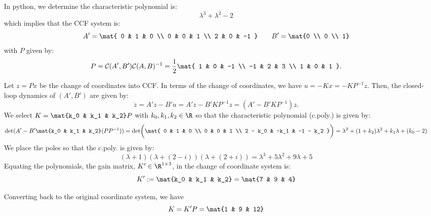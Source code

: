 \documentclass{homework}
\newcommand{\control}{\mathcal{C}}
\begin{document}
\begin{letterenum}
In python, we determine the characteristic polynomial is:
\begin{equation*}
    \lambda^3 + \lambda^2 - 2
\end{equation*}
which implies that the CCF system is:
\begin{equation*}
    A' = \mat{
        0 & 1 & 0 \\
        0 & 0 & 1 \\
        2 & 0 & -1
    } \qquad B' = \mat{0 \\ 0 \\ 1}
\end{equation*}
with $P$ given by:
\begin{equation*}
    P = \control(A', B') \control(A, B)^{-1} = \frac{1}{2}\mat{
        1 & 0 & -1 \\
        -1 & 2 & 3 \\
        1 & 0 & 1
    }.
\end{equation*}
\item 
Let $z = Px$ be the change of coordinates into CCF. In terms of the change of coordinates,
we have $u = -Kx = -KP^{-1}z$. Then, the closed-loop
dynamics of $(A', B')$ are given by:
\begin{equation*}
    \dot{z} = A'z - B'u = A'z - B'KP^{-1}z = (A' - B'KP^{-1})z.
\end{equation*}
We select $K = \mat{k_0 & k_1 & k_2}P$ with $k_0,k_1,k_2\in\R$ so that the characteristic polynomial (c.poly.)
is given by:
\begin{equation*}
    \det(A' - B'\mat{k_0 & k_1 & k_2} (PP^{-1})) = \det\biggl(\mat{
        0 & 1 & 0 \\
        0 & 0 & 1 \\
        2 - k_0 & -k_1 & -1 - k_2
    }\biggr) = \lambda^3 + (1 + k_2) \lambda ^2 + k_1 \lambda + (k_0 - 2)
\end{equation*}
We place the poles so that the c.poly. is given by:
\begin{equation*}
    (\lambda + 1)(\lambda + (2 - i))(\lambda + (2 + i)) = \lambda^3 + 5\lambda^2 + 9\lambda + 5
\end{equation*}
Equating the polynomials, the gain matrix, $K'\in\R^{1\times 3}$, in the change of coordinate system is:
\begin{equation*}
    K' := \mat{k_0 & k_1 & k_2} = \mat{7 & 9 & 4}
\end{equation*}
\item 
Converting back to the original coordinate system, we have
\begin{equation*}
    K = K'P = \mat{1 & 9 & 12}
\end{equation*}
\end{letterenum}
\end{document}
